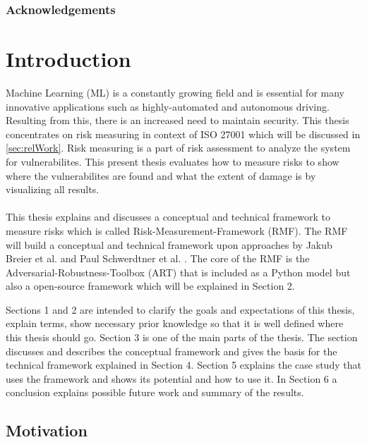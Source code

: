 \begin{abstract}

\end{abstract}

\subsubsection*{Acknowledgements}

\newpage

\section{Introduction}
\label{sec:intro}

Machine Learning (ML) is a constantly growing field and is essential for many innovative applications such as highly-automated and autonomous driving. Resulting from this,
there is an increased need to maintain security. This thesis concentrates on risk measuring in context of ISO 27001 which will be discussed in \ref{sec:relWork}. Risk
measuring is a part of risk assessment to analyze the system for vulnerabilites. This present thesis evaluates how to measure risks to show where the vulnerabilites are found and what the extent of
damage is by visualizing all results. \\ \\
This thesis explains and discusses a conceptual and technical framework to measure risks which is called Risk-Measurement-Framework (RMF). The RMF will build a conceptual and technical
framework upon approaches by Jakub Breier et al. \cite{DBLP:journals/corr/abs-2012-04884} and Paul Schwerdtner et al. \cite{DBLP:journals/corr/abs-2011-04328}. The core of the RMF is the Adversarial-Robustness-Toolbox (ART) that is included as a Python model but also a open-source framework which will be explained in Section 2.

Sections 1 and 2 are intended to clarify the goals and expectations of this thesis, explain terms, show necessary prior knowledge so that it is well defined where this thesis should go. Section 3 is one of the main parts of the thesis. The section discusses and describes the conceptual framework and gives the basis for the technical framework explained in Section 4. Section 5 explains the case study that uses the framework and shows its potential and how to use it. In Section 6 a conclusion explains possible future work and summary of the results.

\subsection{Motivation}


